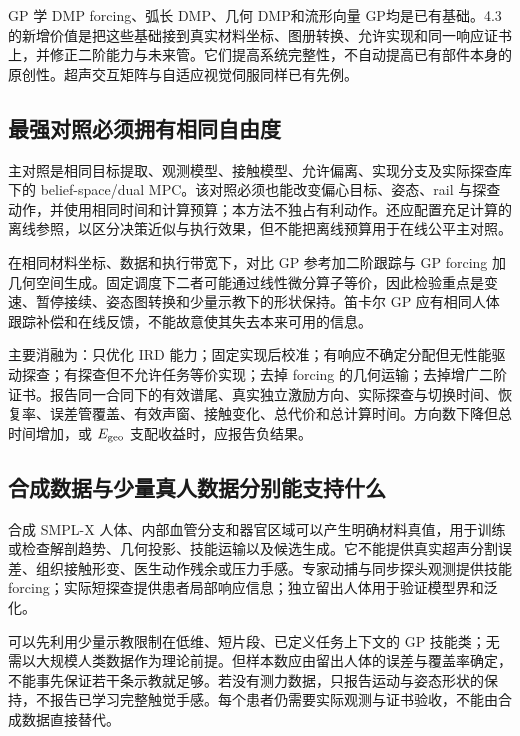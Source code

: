 \documentclass[11pt,a4paper]{article}
\numberwithin{equation}{section}
\theoremstyle{definition}
\begin{document}
GP 学 DMP forcing\cite{gpdmp2026}、弧长 DMP\cite{aldmp2016}、几何 DMP\cite{gdmp2024}和流形向量 GP\cite{gpmanifold2021}均是已有基础。4.3 的新增价值是把这些基础接到真实材料坐标、图册转换、允许实现和同一响应证书上，并修正二阶能力与未来管。它们提高系统完整性，不自动提高已有部件本身的原创性。超声交互矩阵与自适应视觉伺服同样已有先例\cite{krupa2005}。

\subsection{最强对照必须拥有相同自由度}
主对照是相同目标提取、观测模型、接触模型、允许偏离、实现分支及实际探查库下的 belief-space/dual MPC。该对照必须也能改变偏心目标、姿态、rail 与探查动作，并使用相同时间和计算预算；本方法不独占有利动作。还应配置充足计算的离线参照，以区分决策近似与执行效果，但不能把离线预算用于在线公平主对照。

在相同材料坐标、数据和执行带宽下，对比 GP 参考加二阶跟踪与 GP forcing 加几何空间生成。固定调度下二者可能通过线性微分算子等价，因此检验重点是变速、暂停接续、姿态图转换和少量示教下的形状保持。笛卡尔 GP 应有相同人体跟踪补偿和在线反馈，不能故意使其失去本来可用的信息。

主要消融为：只优化 IRD 能力；固定实现后校准；有响应不确定分配但无性能驱动探查；有探查但不允许任务等价实现；去掉 forcing 的几何运输；去掉增广二阶证书。报告同一合同下的有效谱尾、真实独立激励方向、实际探查与切换时间、恢复率、误差管覆盖、有效声窗、接触变化、总代价和总计算时间。方向数下降但总时间增加，或 $E_{\rm geo}$ 支配收益时，应报告负结果。

\subsection{合成数据与少量真人数据分别能支持什么}
合成 SMPL-X 人体、内部血管分支和器官区域可以产生明确材料真值，用于训练或检查解剖趋势、几何投影、技能运输以及候选生成。它不能提供真实超声分割误差、组织接触形变、医生动作残余或压力手感。专家动捕与同步探头观测提供技能 forcing；实际短探查提供患者局部响应信息；独立留出人体用于验证模型界和泛化。

可以先利用少量示教限制在低维、短片段、已定义任务上下文的 GP 技能类；无需以大规模人类数据作为理论前提。但样本数应由留出人体的误差与覆盖率确定，不能事先保证若干条示教就足够。若没有测力数据，只报告运动与姿态形状的保持，不报告已学习完整触觉手感。每个患者仍需要实际观测与证书验收，不能由合成数据直接替代。
\end{document}
